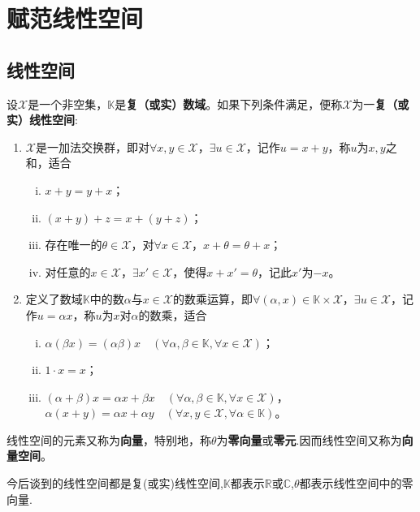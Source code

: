 \documentclass[../../main.tex]{subfiles}%
\begin{document}
\section{赋范线性空间}

\subsection{线性空间}

\begin{definition}[复（或实）线性空间]
设$\mathscr{X}$是一个非空集，$\mathbb{K}$是\textbf{复（或实）数域}。如果下列条件满足，便称$\mathscr{X}$为一\textbf{复（或实）线性空间}:
\begin{enumerate}[(1)]
\item $\mathscr{X}$是一加法交换群，即对$\forall x,y\in\mathscr{X}$，$\exists u\in\mathscr{X}$，记作$u=x+y$，称$u$为$x,y$之和，适合
\begin{enumerate}[(i)]
\item $x+y=y+x$；
\item $(x+y)+z=x+(y+z)$；
\item 存在唯一的$\theta\in\mathscr{X}$，对$\forall x\in\mathscr{X}$，$x+\theta=\theta+x$；
\item 对任意的$x\in\mathscr{X}$，$\exists x'\in\mathscr{X}$，使得$x+x'=\theta$，记此$x'$为$-x$。
\end{enumerate}
\item 定义了数域$\mathbb{K}$中的数$\alpha$与$x\in\mathscr{X}$的数乘运算，即$\forall(\alpha,x)\in\mathbb{K}\times\mathscr{X}$，$\exists u\in\mathscr{X}$，记作$u=\alpha x$，称$u$为$x$对$\alpha$的数乘，适合
\begin{enumerate}[(i)]
\item $\alpha(\beta x)=(\alpha\beta)x\quad(\forall\alpha,\beta\in\mathbb{K},\forall x\in\mathscr{X})$；
\item $1\cdot x=x$；
\item $(\alpha+\beta)x=\alpha x+\beta x\quad(\forall\alpha,\beta\in\mathbb{K},\forall x\in\mathscr{X})$，
$\alpha(x+y)=\alpha x+\alpha y\quad(\forall x,y\in\mathscr{X},\forall\alpha\in\mathbb{K})$。
\end{enumerate}
\end{enumerate}
线性空间的元素又称为\textbf{向量}，特别地，称$\theta$为\textbf{零向量}或\textbf{零元}.因而线性空间又称为\textbf{向量空间}。
\end{definition}
\begin{remark}
今后谈到的线性空间都是复(或实)线性空间,$\mathbb{K}$都表示$\mathbb{R}$或$\mathbb{C}$,$\theta$都表示线性空间中的零向量.
\end{remark}
\end{document}
